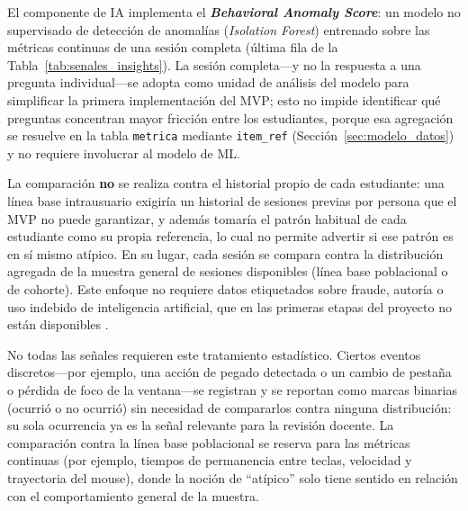 El componente de IA implementa el \textbf{\textit{Behavioral Anomaly Score}}: un modelo no supervisado de detección de anomalías (\textit{Isolation Forest}) \parencite{Liu2008, Liu2012} entrenado sobre las métricas continuas de una sesión completa (última fila de la Tabla~\ref{tab:senales_insights}). La sesión completa---y no la respuesta a una pregunta individual---se adopta como unidad de análisis del modelo para simplificar la primera implementación del MVP; esto no impide identificar qué preguntas concentran mayor fricción entre los estudiantes, porque esa agregación se resuelve en la tabla \texttt{metrica} mediante \texttt{item\_ref} (Sección~\ref{sec:modelo_datos}) y no requiere involucrar al modelo de ML.

La comparación \textbf{no} se realiza contra el historial propio de cada estudiante: una línea base intrausuario exigiría un historial de sesiones previas por persona que el MVP no puede garantizar, y además tomaría el patrón habitual de cada estudiante como su propia referencia, lo cual no permite advertir si ese patrón es en sí mismo atípico. En su lugar, cada sesión se compara contra la distribución agregada de la muestra general de sesiones disponibles (línea base poblacional o de cohorte). Este enfoque no requiere datos etiquetados sobre fraude, autoría o uso indebido de inteligencia artificial, que en las primeras etapas del proyecto no están disponibles \parencite{Chandola2009}.

No todas las señales requieren este tratamiento estadístico. Ciertos eventos discretos---por ejemplo, una acción de pegado detectada o un cambio de pestaña o pérdida de foco de la ventana---se registran y se reportan como marcas binarias (ocurrió o no ocurrió) sin necesidad de compararlos contra ninguna distribución: su sola ocurrencia ya es la señal relevante para la revisión docente. La comparación contra la línea base poblacional se reserva para las métricas continuas (por ejemplo, tiempos de permanencia entre teclas, velocidad y trayectoria del mouse), donde la noción de ``atípico'' solo tiene sentido en relación con el comportamiento general de la muestra.

